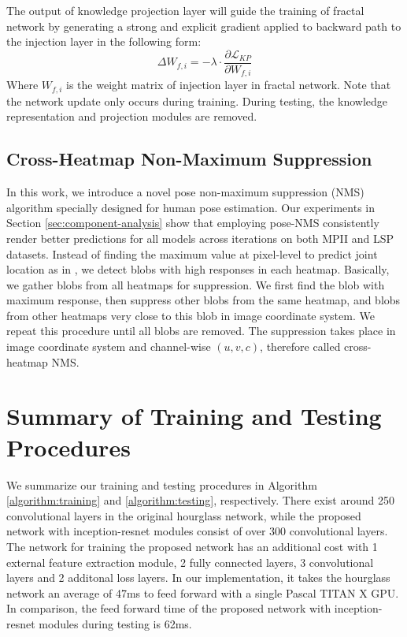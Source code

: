 \documentclass[journal ]{IEEEtran}
\begin{document}
The output of knowledge projection layer will guide the training of fractal network by generating a strong and explicit gradient applied to backward path to the injection layer in the following form:
\begin{equation}
\Delta W_{f, i} = - \lambda \cdot \dfrac{\partial \mathcal{L}_{KP}}{\partial W_{f,i}}
\end{equation}
Where $W_{f, i}$ is the weight matrix of injection layer in fractal network.
Note that the network update only occurs during training. During testing, the knowledge representation and projection modules are removed. 


\subsection{Cross-Heatmap Non-Maximum Suppression}

In this work, we introduce a novel pose non-maximum suppression (NMS) algorithm specially designed for human pose estimation.
Our experiments in Section \ref{sec:component-analysis} show that employing pose-NMS consistently render better predictions for all models across iterations on both MPII \cite{andriluka20142d} and LSP \cite{johnson2010clustered} datasets.
Instead of finding the maximum value at pixel-level to predict joint location as in \cite{newell2016stacked, belagiannis2016recurrent, wei2016convolutional, bulat2016human}, we detect blobs with high responses in each heatmap. Basically, we gather blobs from all heatmaps for suppression. We first find the blob with maximum response, then suppress other blobs from the same heatmap, and blobs from other heatmaps very close to this blob in image coordinate system. We repeat this procedure until all blobs are removed. The suppression takes place in image coordinate system and channel-wise $(u, v, c)$, therefore called cross-heatmap NMS. 


\section{Summary of Training and Testing Procedures}

We summarize our training and testing procedures in Algorithm \ref{algorithm:training} and \ref{algorithm:testing}, respectively. 
There exist around 250 convolutional layers in the original hourglass network, while the proposed network with inception-resnet modules consist of over 300 convolutional layers. The network for training the proposed network has an additional cost with 1 external feature extraction module, 2 fully connected layers, 3 convolutional layers and 2 additonal loss layers. In our implementation, it takes the hourglass network  an average of 47ms to feed forward with a single Pascal TITAN X GPU. In comparison, the feed forward time of the proposed network with inception-resnet modules during testing is 62ms.
\end{document}
